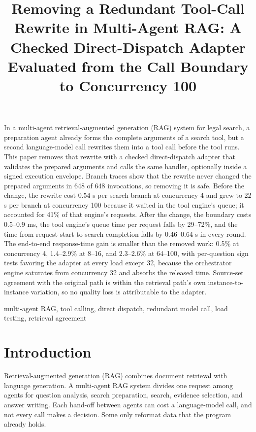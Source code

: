 \documentclass[paper]{ieice}
\title[Direct Dispatch in Multi-Agent RAG]
{Removing a Redundant Tool-Call Rewrite in Multi-Agent RAG: A Checked Direct-Dispatch Adapter Evaluated from the Call Boundary to Concurrency 100}
\begin{document}
\maketitle
\raggedbottom
\begin{summary}
In a multi-agent retrieval-augmented generation (RAG) system for legal search, a preparation agent already forms the complete arguments of a search tool, but a second language-model call rewrites them into a tool call before the tool runs. This paper removes that rewrite with a checked direct-dispatch adapter that validates the prepared arguments and calls the same handler, optionally inside a signed execution envelope. Branch traces show that the rewrite never changed the prepared arguments in 648 of 648 invocations, so removing it is safe. Before the change, the rewrite cost 0.54 s per search branch at concurrency 4 and grew to 22 s per branch at concurrency 100 because it waited in the tool engine's queue; it accounted for 41\% of that engine's requests. After the change, the boundary costs 0.5--0.9 ms, the tool engine's queue time per request falls by 29--72\%, and the time from request start to search completion falls by 0.46--0.64 s in every round. The end-to-end response-time gain is smaller than the removed work: 0.5\% at concurrency 4, 1.4--2.9\% at 8--16, and 2.3--2.6\% at 64--100, with per-question sign tests favoring the adapter at every load except 32, because the orchestrator engine saturates from concurrency 32 and absorbs the released time. Source-set agreement with the original path is within the retrieval path's own instance-to-instance variation, so no quality loss is attributable to the adapter.
\end{summary}
\begin{keywords}
multi-agent RAG, tool calling, direct dispatch, redundant model call, load testing, retrieval agreement
\end{keywords}

\section{Introduction}
Retrieval-augmented generation (RAG) combines document retrieval with language generation\cite{rag}. A multi-agent RAG system divides one request among agents for question analysis, search preparation, search, evidence selection, and answer writing. Each hand-off between agents can cost a language-model call, and not every call makes a decision. Some only reformat data that the program already holds.
\end{document}
